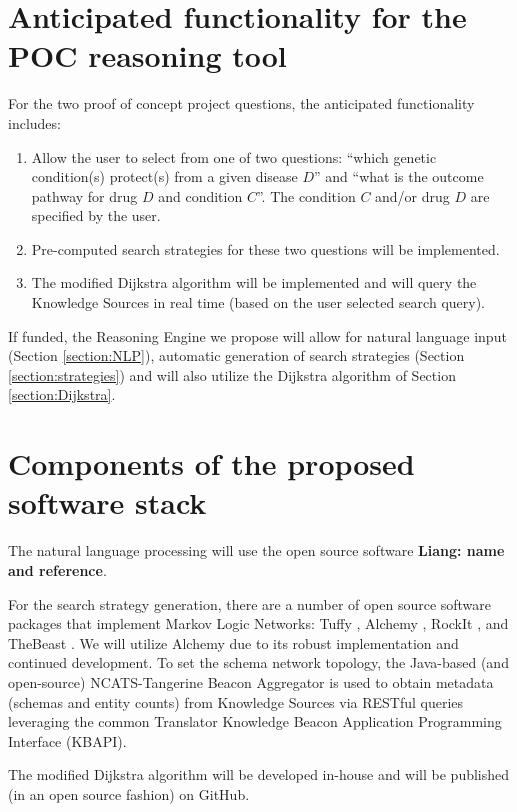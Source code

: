 \documentclass[11pt,notitlepage]{article}
\begin{document}
\section{Anticipated functionality for the POC reasoning tool}
For the two proof of concept project questions, the anticipated functionality includes:
\begin{enumerate}
\item Allow the user to select from one of two questions: ``which genetic
  condition(s) protect(s) from a given disease $D$'' and ``what is the outcome
  pathway for drug $D$ and condition $C$''. The condition $C$ and/or drug $D$
  are specified by the user.
\item Pre-computed search strategies for these two questions will be implemented.
\item The modified Dijkstra algorithm will be implemented and will query the
  Knowledge Sources in real time (based on the user selected search query).
\end{enumerate}
If funded, the Reasoning Engine we propose will allow for natural language input
(Section \ref{section:NLP}), automatic generation of search strategies (Section
\ref{section:strategies}) and will also utilize the Dijkstra algorithm of
Section \ref{section:Dijkstra}.

\section{Components of the proposed software stack}
The natural language processing will use the open source software \textbf{Liang: name and reference}.

For the search strategy generation, there are a number of open source software
packages that implement Markov Logic Networks: Tuffy
\cite{DBLP:journals/pvldb/NiuRDS11}, Alchemy \cite{kok2006alchemy}, RockIt
\cite{noessner2013rockit}, and TheBeast \cite{riedel08improving}. We will
utilize Alchemy due to its robust implementation and continued development. To
set the schema network topology, the Java-based (and open-source)
NCATS-Tangerine Beacon Aggregator is used to obtain metadata (schemas and entity
counts) from Knowledge Sources via RESTful queries leveraging the common
Translator Knowledge Beacon Application Programming Interface (KBAPI).
 
The modified Dijkstra algorithm will be developed in-house and will be published
(in an open source fashion) on GitHub.
\end{document}
